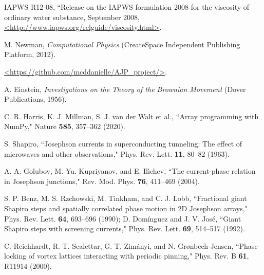 \documentclass[preprint,showpacs,preprintnumbers,amsmath,amssymb,aps,prb]{revtex4-1}
\theoremstyle{remark}
\begin{document}
\begin{thebibliography}{99}
    IAPWS R12-08, 
    ``Release on the IAPWS formulation 2008 for the viscosity of ordinary water substance,  September 2008,
    \url{<http://www.iapws.org/relguide/viscosity.html>}.

   M. Newman, {\it Computational Physics} (CreateSpace Independent Publishing Platform, 2012).

    \url{<https://github.com/mcddanielle/AJP_project/>}.

   A. Einstein, {\it Investigations on the Theory of the Brownian Movement}  (Dover Publications, 1956).

     C. R. Harris, K. J. Millman, S. J. van der Walt et al.,  ``Array programming with NumPy,"  Nature {\bf 585}, 357--362 (2020). %
      
     S. Shapiro, ``Josephson currents in superconducting tunneling: The effect of microwaves and other observations," Phys. Rev. Lett. {\bf 11}, 80--82 (1963).

     A. A. Golubov, M. Yu. Kupriyanov, and E. Il{\`i}chev, ``The current-phase relation in Josephson junctions," Rev. Mod. Phys. {\bf 76}, 411--469 (2004).

      S. P. Benz, M. S. Rzchowski, M. Tinkham, and C. J. Lobb, ``Fractional giant Shapiro steps and spatially correlated phase motion in 2D Josephson arrays," Phys. Rev. Lett. {\bf 64}, 693--696 (1990); D. Dom{\'i}nguez and J. V. Jos{\'e}, ``Giant Shapiro steps with screening currents," Phys. Rev. Lett. {\bf 69}, 514--517 (1992).

     C. Reichhardt, R. T. Scalettar, G. T. Zim{\'a}nyi, and N. Gr{\o}nbech-Jensen,  ``Phase-locking of vortex lattices interacting with periodic pinning,"  Phys. Rev. B {\bf 61}, R11914 (2000).
     

\end{thebibliography}
\end{document}
